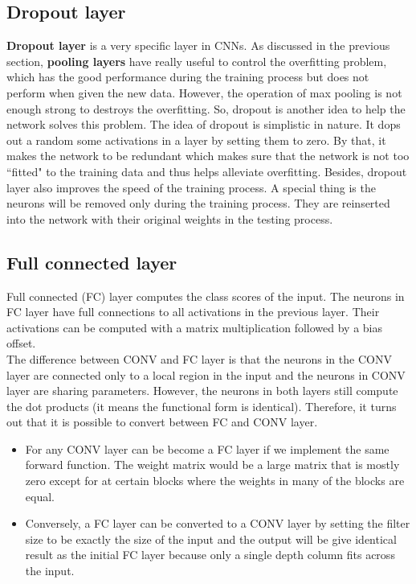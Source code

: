 \subsection{Dropout layer}

\textbf{Dropout layer} \cite{} is a very specific layer in CNNs. As discussed in the previous section, \textbf{pooling layers} have really useful to control the overfitting problem, which has the good performance during the training process but does not perform when given the new data. However, the operation of max pooling is not enough strong to destroys the overfitting. So, dropout is another idea to help the network solves this problem. The idea of dropout is simplistic in nature. It dops out a random some activations in a layer by setting them to zero. By that, it makes the network to be redundant which makes sure that the network is not too ``fitted" to the training data and thus helps alleviate overfitting. Besides, dropout layer also improves the speed of the training process. A special thing is the neurons will be removed only during the training process. They are reinserted into the network with their original weights in the testing process.

\subsection{Full connected layer}
Full connected (FC) layer computes the class scores of the input. The neurons in FC layer have full connections to all activations in the previous layer. Their activations can be computed with a matrix multiplication followed by a bias offset.\\[0.2cm]
The difference between CONV and FC layer is that the neurons in the CONV layer are connected only to a local region in the input and the neurons in CONV layer are sharing parameters. However, the neurons in both layers still compute the dot products (it means the functional form is identical). Therefore, it turns out that it is possible to convert between FC and CONV layer.
\begin{itemize}
	\item For any CONV layer can be become a FC layer if we implement the same forward function. The weight matrix would be a large matrix that is mostly zero except for at certain blocks where the weights in many of the blocks are equal.
	\item Conversely, a FC layer can be converted to a CONV layer by setting the filter size to be exactly the size of the input and the output will be give identical result as the initial FC layer because only a single depth column fits across the input.
\end{itemize}
